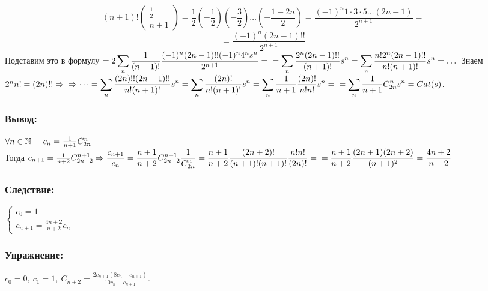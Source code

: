 \documentclass[12pt, letterpaper, twoside]{article}
\newcommand{\DS}{\displaystyle}
\begin{document}
    \[(n + 1)!\begin{pmatrix}
        \frac{1}{2} \\ n + 1
    \end{pmatrix} = \frac{1}{2}\left( -\frac{1}{2} \right)\left( -\frac{3}{2} \right)\dots \left( -\frac{1 - 2n}{2} \right) = \frac{(-1)^n1\cdot3\cdot 5\dots (2n - 1)}{2^{n + 1}}=\]
    \[=\frac{(-1)^n (2n - 1)!!}{2^{n + 1}}\]
    Подставим это в формулу $= 2\DS \sum_{n} \frac{1}{(n + 1)!} \frac{(-1)^n (2n - 1)!! (-1)^n 4^n s^n}{2^{n + 1}} =\\
    = \sum_{n} \frac{2^n(2n - 1)!!}{(n + 1)!}s^n = \sum_{n} \frac{n! 2^n(2n - 1)!!}{n!(n + 1)!}s^n = \dots$ Знаем $2^n n! = (2n)!!\Rightarrow\\
    \DS\Rightarrow \dots = \sum_n \frac{(2n)!!(2n - 1)!!}{n! (n + 1)!} s^n = \sum_n \frac{(2n)!}{n! (n + 1)!} s^n = \sum_n \frac{1}{n + 1} \frac{(2n)!}{n! n!}s^n =\\
    = \sum_{n}\frac{1}{n + 1}C^n_{2n}s^n = Cat(s)$.\\
    \subsubsection*{Вывод:}
    $\forall n\in \mathbb{N}\hspace{0.5cm} c_n = \frac{1}{n + 1} C_{2n}^n$\\
    Тогда $c_{n + 1} = \frac{1}{n + 2} C^{n + 1}_{2n + 2}\Rightarrow \DS\frac{c_{n + 1}}{c_n} = \frac{n + 1}{n + 2} C_{2n + 2}^{n + 1}\frac{1}{C^{n}_{2n}} = \frac{n + 1}{n + 2}\frac{(2n + 2)!}{(n + 1)!(n + 1)!} \frac{n! n!}{(2n)!} =\\
    = \frac{n + 1}{n + 2}\frac{(2n + 1)(2n + 2)}{(n + 1)^2} = \frac{4n + 2}{n + 2}$\\
    \subsubsection*{Следствие:}
    $\begin{cases}
        c_0 = 1\\
        c_{n + 1} = \frac{4n + 2}{n + 2} c_n
    \end{cases}$\\
    \subsubsection*{Упражнение:}
    $c_0 = 0,\ c_1 = 1,\ C_{n + 2} = \frac{2c_{n + 1}(8c_n + c_{n + 1})}{10 c_n - c_{n + 1}}$.
    
\end{document}
